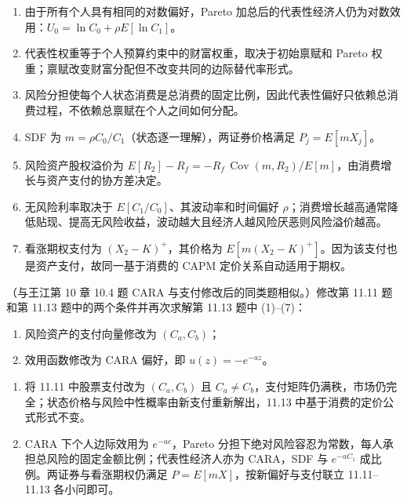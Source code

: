 \begin{solution}
\begin{enumerate}[label=(\alph*)]
\item 由于所有个人具有相同的对数偏好，Pareto 加总后的代表性经济人仍为对数效用：$U_0=\ln C_0+\rho E[\ln C_1]$。
\item 代表性权重等于个人预算约束中的财富权重，取决于初始禀赋和 Pareto 权重；禀赋改变财富分配但不改变共同的边际替代率形式。
\item 风险分担使每个人状态消费是总消费的固定比例，因此代表性偏好只依赖总消费过程，不依赖总禀赋在个人之间如何分配。
\item SDF 为 $m=\rho C_0/C_1$（状态逐一理解），两证券价格满足 $P_j=E[mX_j]$。
\item 风险资产股权溢价为 $E[R_2]-R_f=-R_f\,\operatorname{Cov}(m,R_2)/E[m]$，由消费增长与资产支付的协方差决定。
\item 无风险利率取决于 $E[C_1/C_0]$、其波动率和时间偏好 $\rho$；消费增长越高通常降低贴现、提高无风险收益，波动越大且经济人越风险厌恶则风险溢价越高。
\item 看涨期权支付为 $(X_2-K)^+$，其价格为 $E[m(X_2-K)^+]$。因为该支付也是资产支付，故同一基于消费的 CAPM 定价关系自动适用于期权。
\end{enumerate}
\end{solution}
\begin{problem}
（与王江第 10 章 10.4 题 CARA 与支付修改后的同类题相似。）修改第 11.11 题和第 11.13 题中的两个条件并再次求解第 11.13 题中 (1)--(7)：
\begin{enumerate}[label=(\alph*)]
    \item 风险资产的支付向量修改为 $(C_a,C_b)$；
    \item 效用函数修改为 CARA 偏好，即 $u(z)=-e^{-az}$。
\end{enumerate}
\end{problem}
\begin{solution}
\begin{enumerate}[label=(\alph*)]
\item 将 11.11 中股票支付改为 $(C_a,C_b)$ 且 $C_a\ne C_b$，支付矩阵仍满秩，市场仍完全；状态价格与风险中性概率由新支付重新解出，11.13 中基于消费的定价公式形式不变。
\item CARA 下个人边际效用为 $e^{-a c}$，Pareto 分担下绝对风险容忍为常数，每人承担总风险的固定金额比例；代表性经济人亦为 CARA，SDF 与 $e^{-aC_1}$ 成比例。两证券与看涨期权仍满足 $P=E[mX]$，按新偏好与支付联立 11.11--11.13 各小问即可。
\end{enumerate}
\end{solution}
